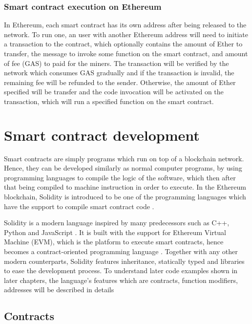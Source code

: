 \documentclass[twoside,numperchapter]{tutthesis} %
\begin{document}
\subsection{Smart contract execution on Ethereum}

In Ethereum, each smart contract has its own address after being released to the network. To run one, an user with another Ethereum address will need to initiate a transaction to the contract, which optionally contains the amount of Ether to transfer, the message to invoke some function on the smart contract, and amount of fee (GAS) to paid for the miners. The transaction will be verified by the network which consumes GAS gradually and if the transaction is invalid, the remaining fee will be refunded to the sender. Otherwise, the amount of Ether specified will be transfer and the code invocation will be activated on the transaction, which will run a specified function on the smart contract.

\chapter{Smart contract development}
\label{ch:smartcontractdev}

Smart contracts are simply programs which run on top of a blockchain network. Hence, they can be developed similarly as normal computer programs, by using programming languages to compile the logic of the software, which then after that being compiled to machine instruction in order to execute. In the Ethereum blockchain, Solidity is introduced to be one of the programming languages which have the support to compile smart contract code \citep{SolidityDocumentation}. 

Solidity is a modern language inspired by many predecessors such as C++, Python and JavaScript \citep{SolidityDocumentation}. It is built with the support for Ethereum Virtual Machine (EVM), which is the platform to execute smart contracts, hence becomes a contract-oriented programming language \citep{SolidityDocumentation}. Together with any other modern counterparts, Solidity features inheritance, statically typed and libraries to ease the development process. To understand later code examples shown in later chapters, the language's features which are contracts, function modifiers, addresses will be described in details

\section{Contracts}
\end{document}
